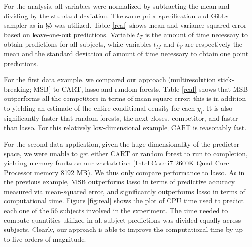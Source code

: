 \documentclass{article} %
\begin{document}

For the analysis, all variables were normalized by subtracting the mean and dividing by the standard deviation. The same prior specification and Gibbs sampler as in \S 5 was  utilized. Table \ref{real} shows mean and variance squared error based on leave-one-out predictions. Variable $t_{T}$ is the amount of time necessary to obtain predictions for all subjects, while variables $t_M$ and $t_V$ are respectively the mean and the standard deviation of amount of time necessary to obtain one point predictions.

For the first data example, we compared our approach (multiresolution stick-breaking; MSB) to CART, lasso and random forests. 
Table \ref{real} shows that MSB outperforms all the competitors in terms of mean square error; this is in addition to yielding an estimate of the entire conditional density for each $y_i$.  It is also significantly faster that random forests, the next closest competitor, and faster than lasso.  For this relatively low-dimensional example, CART is reasonably fast.  

 
 For the second data application, given the huge dimensionality of the predictor space, we were unable to get either CART or random forest to run to completion, yielding memory faults on our workstation (Intel Core i7-2600K Quad-Core Processor memory 8192 MB).  We thus only compare performance to lasso.  As in the previous example, MSB outperforms lasso in terms of predictive accuracy measured via mean-squared error, and significantly outperforms lasso in terms of computational time.  
Figure \ref{fig:real} shows the plot of CPU time used to predict each one of the $56$ subjects involved in the experiment. The time needed to compute quantities utilized in all subject predictions was divided equally across subjects. Clearly, our approach is able to improve the computational time by up to five orders of magnitude. 
\end{document}

